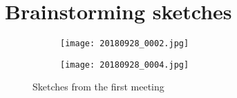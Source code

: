 \chapter{Brainstorming sketches}
\label{ap:notes}

\begin{figure}
    \centering
    \begin{subfigure}{0.4\textwidth}
        \centering
        \texttt{[image: 20180928\_0002.jpg]}
    \end{subfigure}
    \hspace{0.05\textwidth}
    \begin{subfigure}{0.4\textwidth}
        \centering
        \texttt{[image: 20180928\_0004.jpg]}
    \end{subfigure}
    \caption{Sketches from the first meeting}
    \label{fig:sketch-meeting}
\end{figure}
